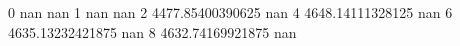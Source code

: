 0 nan nan
1 nan nan
2 4477.85400390625 nan
4 4648.14111328125 nan
6 4635.13232421875 nan
8 4632.74169921875 nan
